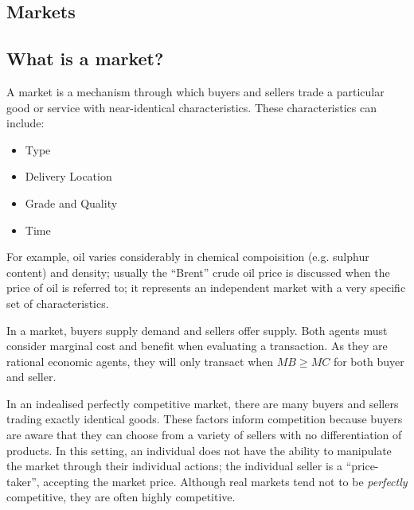 \documentclass[12pt]{report}
\begin{document}
\begin{flushleft}
\chapter*{Markets}

\section*{What is a market?}
A market is a mechanism through which buyers and sellers trade a particular good or service with 
near-identical characteristics. These characteristics can include:
\begin{itemize}
    \item Type
    \item Delivery Location
    \item Grade and Quality
    \item Time
\end{itemize}
For example, oil varies considerably in chemical compoisition (e.g. sulphur content) and density;
usually the ``Brent'' crude oil price is discussed when the price of oil is referred to; it represents
an independent market with a very specific set of characteristics.

\bigskip 
In a market, buyers supply demand and sellers offer supply. Both agents must consider marginal 
cost and benefit when evaluating a transaction. As they are rational economic agents, they
will only transact when \(MB \geq MC\) for both buyer and seller.

\bigskip
In an indealised perfectly competitive market, there are many buyers and sellers trading exactly
identical goods. These factors inform competition because buyers are aware that they can choose from
a variety of sellers with no differentiation of products. In this setting, an individual does not 
have the ability to manipulate the market through their individual actions; the individual seller
is a ``price-taker'', accepting the market price. Although real markets tend not to be \textit{perfectly} 
competitive, they are often highly competitive.


\end{flushleft}
\end{document}
